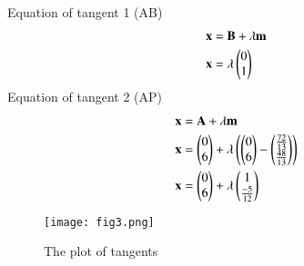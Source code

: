 \documentclass[journal,12pt,twocolumn]{IEEEtran}
\begin{document}
Equation of tangent 1 (AB)
\begin{align}
    \mathbf{x}&=\mathbf{B}+\lambda\mathbf{m}\\
    \mathbf{x}&=\lambda\begin{pmatrix}0\\1\end{pmatrix}
\end{align}
Equation of tangent 2 (AP)
\begin{align}
    \mathbf{x}&=\mathbf{A}+\lambda\mathbf{m}\\
    \mathbf{x}&=\begin{pmatrix}0\\6\end{pmatrix}+\lambda\left(\begin{pmatrix}0\\6\end{pmatrix}-\begin{pmatrix}\frac{72}{13}\\ \frac{48}{13}\end{pmatrix}\right)\\
    \mathbf{x}&=\begin{pmatrix}0\\6\end{pmatrix}+\lambda\begin{pmatrix}1\\ \frac{-5}{12}\end{pmatrix}
\end{align}
\begin{figure}[!ht]
   \centering
   \texttt{[image: fig3.png]}
   \caption{The plot of tangents}
\end{figure}
\end{document}
